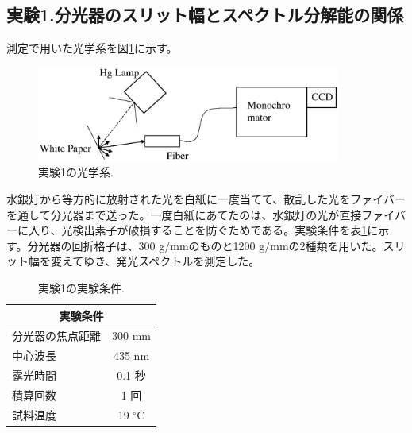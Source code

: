 \documentclass[11pt,a4j]{jsarticle}
\begin{document}
\subsection{実験1.分光器のスリット幅とスペクトル分解能の関係}


測定で用いた光学系を図\ref{fig_system1}に示す。

\begin{figure}[h]
 \centering
 \includegraphics[clip,width=10cm]{start_system1.eps}
 \caption{実験1の光学系.}
 \label{fig_system1}
\end{figure}

水銀灯から等方的に放射された光を白紙に一度当てて、散乱した光をファイバーを通して分光器まで送った。一度白紙にあてたのは、水銀灯の光が直接ファイバーに入り、光検出素子が破損することを防ぐためである。実験条件を表\ref{col_1}に示す。分光器の回折格子は、300 g/mmのものと1200 g/mmの2種類を用いた。スリット幅を変えてゆき、発光スペクトルを測定した。

\begin{table}[ht]
 \centering
 \caption{実験1の実験条件.}
 \begin{tabular}{lc}\hline
  \multicolumn{2}{c}{実験条件}      \\ \hline
  分光器の焦点距離 & 300 mm         \\
  中心波長         & 435 nm         \\
  露光時間         & 0.1 秒         \\
  積算回数         & 1 回           \\
  試料温度         & 19 ${}^\circ$C \\ \hline
 \end{tabular}
 \label{col_1}
\end{table}

\end{document}
